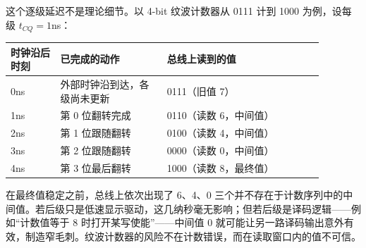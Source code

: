这个逐级延迟不是理论细节。以 4-bit 纹波计数器从 0111 计到 1000 为例，设每级 $t_{CQ}=1$ns：

\begin{longtable}{L{0.14\linewidth}L{0.30\linewidth}L{0.44\linewidth}}
\toprule
时钟沿后时刻 & 已完成的动作 & 总线上读到的值 \\
\midrule
0ns & 外部时钟沿到达，各级尚未更新 & 0111（旧值 7） \\\tablerowrule
1ns & 第 0 位翻转完成 & 0110（读数 6，中间值） \\\tablerowrule
2ns & 第 1 位跟随翻转 & 0100（读数 4，中间值） \\\tablerowrule
3ns & 第 2 位跟随翻转 & 0000（读数 0，中间值） \\\tablerowrule
4ns & 第 3 位最后翻转 & 1000（读数 8，最终值） \\
\bottomrule
\end{longtable}

在最终值稳定之前，总线上依次出现了 6、4、0 三个并不存在于计数序列中的中间值。若后级只是低速显示驱动，这几纳秒毫无影响；但若后级是译码逻辑——例如“计数值等于 8 时打开某写使能”——中间值 0 就可能让另一路译码输出意外有效，制造窄毛刺。纹波计数器的风险不在计数错误，而在读取窗口内的值不可信。

